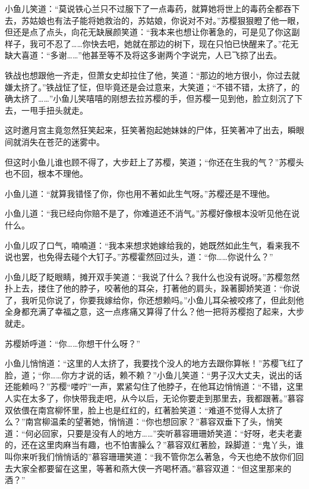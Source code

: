 \documentclass[12pt,oneside]{book}
\begin{document}
小鱼儿笑道：``莫说铁心兰只不过服下了一点毒药，就算她将世上的毒药全都吞下去，苏姑娘也有法子能将她救治的，苏姑娘，你说对不对。''苏樱狠狠瞪了他一眼，但还是点了点头，向花无缺展颜笑道：``我本来也想让你著急的，可是见了你这副样子，我可不忍了\ldots\ldots 你快去吧，她就在那边的树下，现在只怕已快醒来了。''花无缺大喜道：``多谢\ldots\ldots{}''他甚至等不及将这多谢两个字说完，人已飞掠了出去。

铁战也想跟他一齐走，但萧女史却拉住了他，笑道：``那边的地方很小，你过去就嫌太挤了。''铁战怔了怔，但毕竟还是会过意来，大笑道；``不错不错，太挤了，的确太挤了\ldots\ldots{}''小鱼儿笑嘻嘻的刚想去拉苏樱的手，但苏樱一见到他，脸立刻沉了下去，一甩手扭头就走。

这时邀月宫主竟忽然狂笑起来，狂笑著抱起她妹妹的尸体，狂笑著冲了出去，瞬眼间就消失在苍茫的迷雾中。

但这时小鱼儿谁也顾不得了，大步赶上了苏樱，笑道；``你还在生我的气？''苏樱头也不回，根本不理他。

小鱼儿道：``就算我错怪了你，你也用不著如此生气呀。''苏樱还是不理他。

小鱼儿道：``我已经向你赔不是了，你难道还不消气。''苏樱好像根本没听见他在说什么。

小鱼儿叹了口气，喃喃道：``我本来想求她嫁给我的，她既然如此生气，看来我不说也罢，也免得去碰个大钉子。''苏樱霍然回过头，道：``你\ldots\ldots 你说什么？''

小鱼儿眨了眨眼睛，摊开双手笑道：``我说了什么？我什么也没有说呀。''苏樱忽然扑上去，搂住了他的脖子，咬著他的耳朵，打著他的肩头，跺著脚娇笑道：``你说了，我听见你说了，你要我嫁给你，你还想赖吗。''小鱼儿耳朵被咬疼了，但此刻他全身都充满了幸福之意，这一点疼痛又算得了什么？他一把将苏樱抱了起来，大步就走。

苏樱娇呼道：``你\ldots\ldots 你想干什么呀？''

小鱼儿悄悄道：``这里的人太挤了，我要找个没人的地方去跟你算帐！''苏樱飞红了脸，道；``你\ldots\ldots 你方才说的话，赖不赖？''小鱼儿笑道：``男子汉大丈夫，说出的话还能赖吗？''苏樱``喽咛''一声，累紧勾住了他脖子，在他耳边悄悄道：``不错，这里人实在太多了，你快带我走吧，从今以后，无论你要走到那里去，我都跟著。''慕容双依偎在南宫柳怀里，脸上也是红红的，红著脸笑道：``难道不觉得人太挤了么？''南宫柳温柔的望著她，悄悄道：``你也想回家？''慕容双垂下了头，悄笑道：``何必回家，只要是没有人的地方\ldots\ldots{}''突听慕容珊珊娇笑道：``好呀，老夫老妻的，还在这里肉麻当有趣，也不怕害臊么？''慕容双红著脸，跺脚道：``鬼丫头，谁叫你来听我们悄悄话的''慕容珊珊笑道：``我不管你怎么著急，今天也绝不放你们回去大家全都要留在这里，等著和燕大侠一齐喝杯酒。''慕容双道：``但这里那来的酒？''
\end{document}
